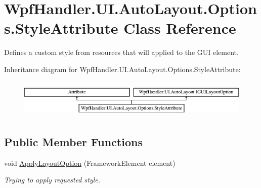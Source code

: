\hypertarget{class_wpf_handler_1_1_u_i_1_1_auto_layout_1_1_options_1_1_style_attribute}{}\section{Wpf\+Handler.\+U\+I.\+Auto\+Layout.\+Options.\+Style\+Attribute Class Reference}
\label{class_wpf_handler_1_1_u_i_1_1_auto_layout_1_1_options_1_1_style_attribute}


Defines a custom style from resources that will applied to the G\+UI element.  


Inheritance diagram for Wpf\+Handler.\+U\+I.\+Auto\+Layout.\+Options.\+Style\+Attribute\+:\begin{figure}[H]
\begin{center}
\leavevmode
\includegraphics[height=1.891892cm]{d4/db4/class_wpf_handler_1_1_u_i_1_1_auto_layout_1_1_options_1_1_style_attribute}
\end{center}
\end{figure}
\subsection*{Public Member Functions}
\begin{DoxyCompactItemize}
\item 
void \mbox{\hyperlink{class_wpf_handler_1_1_u_i_1_1_auto_layout_1_1_options_1_1_style_attribute_a4507ba7b9729b527b0c4f57bffaac0be}{Apply\+Layout\+Option}} (Framework\+Element element)
\begin{DoxyCompactList}\small\item\em Trying to apply requested style. \end{DoxyCompactList}\end{DoxyCompactItemize}
